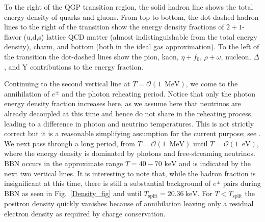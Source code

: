 \documentclass[universe,article,submit,moreauthors,pdftex,a4paper]{Definitions/mdpi}
\newcommand{\MeV}{\text{ MeV}}
\newcommand{\keV}{\text{ keV}}
\newcommand{\eV}{\text{ eV}}
\newcommand*{\rf}[1]{Fig.~{\ref{#1}}}
\begin{document}
To the right of the QGP transition region, the solid hadron line shows the total energy density of quarks and gluons. From top to bottom, the dot-dashed hadron lines to the right of the transition show the energy density fractions of $2+1$-flavor (u,d,s) lattice QCD matter (almost indistinguishable from the total energy density), charm, and bottom (both in the ideal gas approximation).  To the left of the transition the dot-dashed lines show the  pion, kaon, $\eta+f_0$, $\rho+\omega$, nucleon,  $\Delta$, and Y contributions to the energy fraction.


Continuing to the second vertical line at $T=\mathcal{O}(1\, \MeV)$, we come to the annihilation  of $e^\pm$ and the photon reheating period.  Notice that only the photon energy density fraction increases here, as we assume here that neutrinos are already decoupled at this time and hence do not share in the reheating process, leading to a difference in photon and neutrino temperatures. This is not strictly correct but it is a reasonable simplifying assumption for the current purpose; see \cite{Mangano:2005cc,Fornengo:1997wa,Mangano:2001iu,Birrell:2012gg}.  We next pass through a long period, from $T=\mathcal{O}(1\, \MeV)$ until $T=\mathcal{O}(1\, \eV)$, where the energy density is dominated by photons and free-streaming neutrinos.  BBN occurs in the approximate range $T=40-70\keV$ and is indicated by the next two vertical lines.  It is interesting to note that, while the hadron fraction is insignificant at this time, there is still a substantial background of $e^\pm$ pairs during BBN as seen in \rf{Density_fig} and until $T_{\mathrm{split}} = 20.36\ \mathrm{keV}$. For $T<T_{\mathrm{split}}$ the positron density quickly vanishes because of annihilation leaving only a residual electron density as required by charge conservation. 
\end{document}

